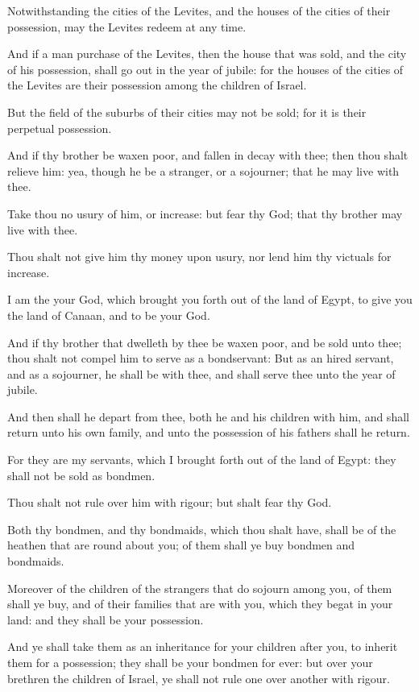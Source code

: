 \verse Notwithstanding the cities of the Levites, and the houses of the cities of their possession, may the Levites redeem at any time.

\verse And if a man purchase of the Levites, then the house that was sold, and the city of his possession, shall go out in the year of jubile: for the houses of the cities of the Levites are their possession among the children of Israel.

\verse But the field of the suburbs of their cities may not be sold; for it is their perpetual possession.

\verse And if thy brother be waxen poor, and fallen in decay with thee; then thou shalt relieve him: yea, though he be a stranger, or a sojourner; that he may live with thee.

\verse Take thou no usury of him, or increase: but fear thy God; that thy brother may live with thee.

\verse Thou shalt not give him thy money upon usury, nor lend him thy victuals for increase.

\verse I am the \LORD your God, which brought you forth out of the land of Egypt, to give you the land of Canaan, and to be your God.

\verse And if thy brother that dwelleth by thee be waxen poor, and be sold unto thee; thou shalt not compel him to serve as a bondservant: \verse But as an hired servant, and as a sojourner, he shall be with thee, and shall serve thee unto the year of jubile.

\verse And then shall he depart from thee, both he and his children with him, and shall return unto his own family, and unto the possession of his fathers shall he return.

\verse For they are my servants, which I brought forth out of the land of Egypt: they shall not be sold as bondmen.

\verse Thou shalt not rule over him with rigour; but shalt fear thy God.

\verse Both thy bondmen, and thy bondmaids, which thou shalt have, shall be of the heathen that are round about you; of them shall ye buy bondmen and bondmaids.

\verse Moreover of the children of the strangers that do sojourn among you, of them shall ye buy, and of their families that are with you, which they begat in your land: and they shall be your possession.

\verse And ye shall take them as an inheritance for your children after you, to inherit them for a possession; they shall be your bondmen for ever: but over your brethren the children of Israel, ye shall not rule one over another with rigour.

